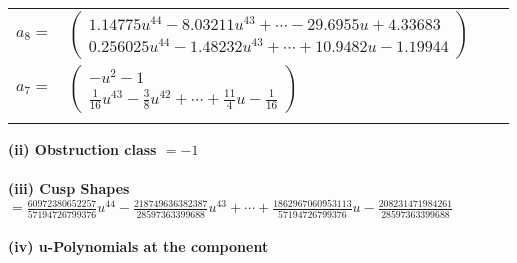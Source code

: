 \documentclass[1p]{elsarticle_modified}
\theoremstyle{definition}
\begin{document}
\begin{tabular}{m{7pt} m{180pt} m{7pt} m{180pt} }
\flushright $a_{8}=$&$\begin{pmatrix}1.14775 u^{44}-8.03211 u^{43}+\cdots-29.6955 u+4.33683\\0.256025 u^{44}-1.48232 u^{43}+\cdots+10.9482 u-1.19944\end{pmatrix}$ \\
\flushright $a_{7}=$&$\begin{pmatrix}- u^2-1\\\frac{1}{16} u^{43}-\frac{3}{8} u^{42}+\cdots+\frac{11}{4} u-\frac{1}{16}\end{pmatrix}$\\&\end{tabular}
\flushleft \textbf{(ii) Obstruction class $= -1$}\\~\\
\flushleft \textbf{(iii) Cusp Shapes $= \frac{60972380652257}{57194726799376} u^{44}-\frac{218749636382387}{28597363399688} u^{43}+\cdots+\frac{1862967060953113}{57194726799376} u-\frac{208231471984261}{28597363399688}$}\\~\\
\newpage\renewcommand{\arraystretch}{1}
\flushleft \textbf{(iv) u-Polynomials at the component}\newline \\
\end{document}

